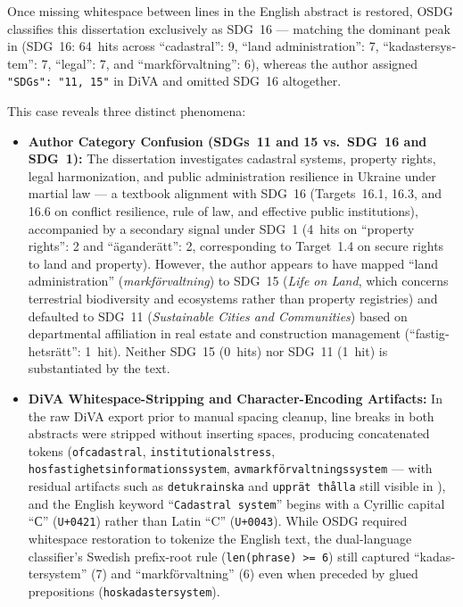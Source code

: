 \begin{casestudySection}
Once missing whitespace between lines in the English abstract is restored, OSDG classifies this dissertation exclusively as \gls{SDG}~16 --- matching the dominant peak in  (\gls{SDG}~16: \num{64}~hits across \enquote{cadastral}: 9, \enquote{land administration}: 7, \enquote{\foreignlanguage{swedish}{kadastersystem}}: 7, \enquote{legal}: 7, and \enquote{\foreignlanguage{swedish}{markförvaltning}}: 6), whereas the author assigned \texttt{"SDGs": "11, 15"} in \gls{DiVA} and omitted \gls{SDG}~16 altogether.

This case reveals three distinct phenomena:
\begin{itemize}
    \item \textbf{Author Category Confusion (\glspl{SDG}~11 and 15 vs.\ \gls{SDG}~16 and \gls{SDG}~1):} The dissertation investigates cadastral systems, property rights, legal harmonization, and public administration resilience in Ukraine under martial law --- a textbook alignment with \gls{SDG}~16 (Targets~16.1, 16.3, and 16.6 on conflict resilience, rule of law, and effective public institutions), accompanied by a secondary signal under \gls{SDG}~1 (\num{4}~hits on \enquote{property rights}: 2 and \enquote{\foreignlanguage{swedish}{äganderätt}}: 2, corresponding to Target~1.4 on secure rights to land and property). However, the author appears to have mapped \enquote{land administration} (\emph{\foreignlanguage{swedish}{markförvaltning}}) to \gls{SDG}~15 (\emph{Life on Land}, which concerns terrestrial biodiversity and ecosystems rather than property registries) and defaulted to \gls{SDG}~11 (\emph{Sustainable Cities and Communities}) based on departmental affiliation in real estate and construction management (\enquote{\foreignlanguage{swedish}{fastighetsrätt}}: 1~hit). Neither \gls{SDG}~15 (\num{0}~hits) nor \gls{SDG}~11 (\num{1}~hit) is substantiated by the text.

    \item \textbf{DiVA Whitespace-Stripping and Character-Encoding Artifacts:} In the raw \gls{DiVA} export prior to manual spacing cleanup, line breaks in both abstracts were stripped without inserting spaces, producing concatenated tokens (\eg \texttt{ofcadastral}, \texttt{institutionalstress}, \texttt{hosfastighetsinformationssystem}, \texttt{avmarkförvaltningssystem} --- with residual artifacts such as \texttt{detukrainska} and \texttt{upprät thålla} still visible in ), and the English keyword \enquote{\texttt{Сadastral system}} begins with a Cyrillic capital \enquote{С} (\texttt{U+0421}) rather than Latin \enquote{C} (\texttt{U+0043}). While OSDG required whitespace restoration to tokenize the English text, the dual-language classifier's Swedish prefix-root rule (\texttt{len(phrase) >= 6}) still captured \enquote{\foreignlanguage{swedish}{kadastersystem}} (7) and \enquote{\foreignlanguage{swedish}{markförvaltning}} (6) even when preceded by glued prepositions (\eg \texttt{hoskadastersystem}).


\end{itemize}
\end{casestudySection}
